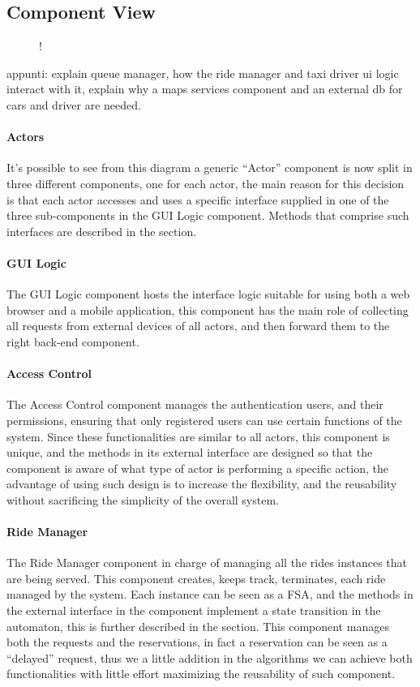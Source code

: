 \subsection{Component View}
\label{sec:component-view}
\begin{figure}[H]
	\centering
	\resizebox{6in}
	{!}{}
\end{figure}
appunti: explain queue manager, how the ride manager and taxi driver ui logic interact with it, explain why a maps services component and an external db for cars and driver are needed.
\paragraph{Actors}
It's possible to see from this diagram a generic ``Actor'' component is now split in three different components, one for each actor, the main reason for this decision is that each actor accesses and uses a specific interface supplied in one of the three sub-components in the GUI Logic component. Methods that comprise such interfaces are described in the  section.
\paragraph{GUI Logic}
The GUI Logic component hosts the interface logic suitable for using both a web browser and a mobile application, this component has the main role of collecting all requests from external devices of all actors, and then forward them to the right back-end component.
\paragraph{Access Control}
The Access Control component manages the authentication users, and their permissions, ensuring that only registered users can use certain functions of the system. \newline Since these functionalities are similar to all actors, this component is unique, and the methods in its external interface are designed so that the component is aware of what type of actor is performing a specific action, the advantage of using such design is to increase the flexibility, and the reusability without sacrificing the simplicity of the overall system.
\paragraph{Ride Manager}
The Ride Manager component in charge of managing all the rides instances that are being served. This component creates, keeps track, terminates, each ride managed by the system. Each instance can be seen as a FSA, and the methods in the external interface in the component implement a state transition in the automaton, this is further described in the  section. \newline
This component manages both the requests and the reservations, in fact a reservation can be seen as a ``delayed'' request, thus we a little addition in the algorithms we can achieve both functionalities with little effort maximizing the reusability of such component.
